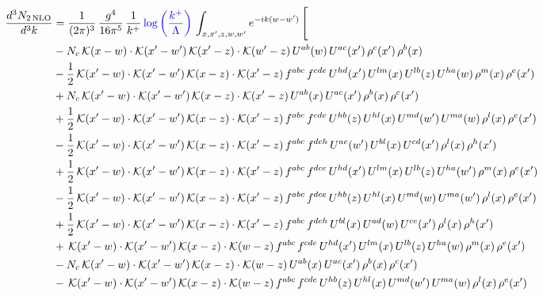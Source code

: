 \documentclass[9pt]{article}
\numberwithin{equation}{section}
\begin{document}
\begin{align}
\frac{d^{3}N_{2\,\mathrm{NLO}}}{d^{3}k} & = \frac{1}{(2\pi)^{3}}\,\frac{g^{4}}{16\pi^{5}}\,\frac{1}{k^{+}}\,{\color{blue}\log{\left(\frac{k^{+}}{\Lambda}\right)}}\,\int_{x,x',z,w,w'}e^{-ik(w-w')}\,\Bigg[\notag\\ & -N_{c}\,\mathcal{K}(x-w)\cdot\mathcal{K}(x'-w')\,\mathcal{K}(x'-z)\cdot\mathcal{K}(w'-z)\,U^{ab}(w)\,U^{ac}(x')\,\rho^{c}(x')\,\rho^{b}(x)\notag\\
& -\frac{1}{2}\,\mathcal{K}(x'-w)\cdot\mathcal{K}(x'-w')\,\mathcal{K}(x-z)\cdot\mathcal{K}(x'-z)\,f^{abc}\,f^{cde}\,U^{hd}(x')\,U^{lm}(x)\,U^{lb}(z)\,U^{ha}(w)\,\rho^{m}(x)\,\rho^{e}(x')\notag\\
& +N_{c}\,\mathcal{K}(x'-w)\cdot\mathcal{K}(x'-w')\,\mathcal{K}(x-z)\cdot\mathcal{K}(x'-z)\,U^{ab}(x)\,U^{ac}(x')\,\rho^{b}(x)\,\rho^{c}(x')\notag\\
& +\frac{1}{2}\,\mathcal{K}(x'-w)\cdot\mathcal{K}(x'-w')\,\mathcal{K}(x-z)\cdot\mathcal{K}(x'-z)\,f^{abc}\,f^{cde}\,U^{hb}(z)\,U^{hl}(x)\,U^{md}(w')\,U^{ma}(w)\,\rho^{l}(x)\,\rho^{e}(x')\notag\\
& -\frac{1}{2}\,\mathcal{K}(x'-w)\cdot\mathcal{K}(x'-w')\,\mathcal{K}(x-z)\cdot\mathcal{K}(x'-z)\,f^{abc}\,f^{deh}\,U^{ae}(w')\,U^{bl}(x)\,U^{cd}(x')\,\rho^{l}(x)\,\rho^{h}(x')\notag \\ & +\frac{1}{2}\,\mathcal{K}(x'-w)\cdot\mathcal{K}(x'-w')\,\mathcal{K}(x-z)\cdot\mathcal{K}(x'-z)\,f^{abc}\,f^{dce}\,U^{hd}(x')\,U^{lm}(x)\,U^{lb}(z)\,U^{ha}(w')\,\rho^{m}(x)\,\rho^{e}(x')\notag\\
& -\frac{1}{2}\,\mathcal{K}(x'-w)\cdot\mathcal{K}(x'-w')\,\mathcal{K}(x-z)\cdot\mathcal{K}(x'-z)\,f^{abc}\,f^{dce}\,U^{hb}(z)\,U^{hl}(x)\,U^{md}(w)\,U^{ma}(w')\,\rho^{l}(x)\,\rho^{e}(x')\notag\\
& +\frac{1}{2}\,\mathcal{K}(x'-w)\cdot\mathcal{K}(x'-w')\,\mathcal{K}(x-z)\cdot\mathcal{K}(x'-z)\,f^{abc}\,f^{deh}\,U^{bl}(x)\,U^{ad}(w)\,U^{ce}(x')\,\rho^{l}(x)\,\rho^{h}(x')\notag\\
& +\,\mathcal{K}(x'-w)\cdot\mathcal{K}(x'-w')\,\mathcal{K}(x-z)\cdot\mathcal{K}(w-z)\,f^{abc}\,f^{cde}\,U^{hd}(x')\,U^{lm}(x)\,U^{lb}(z)\,U^{ha}(w)\,\rho^{m}(x)\,\rho^{e}(x')\notag\\
& -N_{c}\,\mathcal{K}(x'-w)\cdot\mathcal{K}(x'-w')\,\mathcal{K}(x-z)\cdot\mathcal{K}(w-z)\,U^{ab}(x)\,U^{ac}(x')\,\rho^{b}(x)\,\rho^{c}(x')\notag\\
& -\,\mathcal{K}(x'-w)\cdot\mathcal{K}(x'-w')\,\mathcal{K}(x-z)\cdot\mathcal{K}(w-z)\,f^{abc}\,f^{cde}\,U^{hb}(z)\,U^{hl}(x)\,U^{md}(w')\,U^{ma}(w)\,\rho^{l}(x)\,\rho^{e}(x')\notag\\

\end{align}
\end{document}
